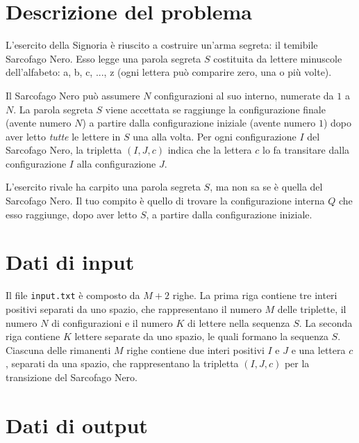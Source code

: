 \documentclass[a4paper,11pt]{article}
\begin{document}
\vspace{0.5cm}



\vspace{0.5cm}

\section*{Descrizione del problema}

L'esercito della Signoria è riuscito a costruire un'arma
segreta: il temibile Sarcofago Nero. Esso legge una parola
segreta $S$ costituita da lettere minuscole dell'alfabeto: a,
b, c, ..., z (ogni lettera può comparire zero, una o più
volte).

Il Sarcofago Nero può assumere $N$ configurazioni al
suo interno, numerate da $1$ a $N$. La parola
segreta $S$ viene accettata se raggiunge la configurazione
finale (avente numero $N$) a partire dalla configurazione
iniziale (avente numero $1$) dopo aver letto \emph{tutte} le lettere
in $S$ una alla volta. Per ogni configurazione $I$
del Sarcofago Nero, la tripletta $(I,J,c)$ indica che la
lettera $c$ lo fa transitare dalla
configurazione $I$ alla configurazione $J$.

L'esercito rivale ha carpito una parola segreta $S$, ma non
sa se è quella del Sarcofago Nero. Il tuo compito è
quello di trovare la configurazione interna $Q$ che esso
raggiunge, dopo aver letto $S$, a partire dalla
configurazione iniziale.


\section*{Dati di input}

Il file \texttt{input.txt} è composto da $M+2$
righe.  La prima riga contiene tre interi positivi separati da uno
spazio, che rappresentano il numero $M$ delle triplette, il
numero $N$ di configurazioni e il numero $K$ di
lettere nella sequenza $S$.  La seconda riga
contiene $K$ lettere separate da uno spazio, le quali
formano la sequenza $S$.  Ciascuna delle
rimanenti $M$ righe contiene due interi
positivi $I$ e $J$ e una lettera $c$,
separati da una spazio, che rappresentano la
tripletta $(I,J,c)$ per la transizione del Sarcofago Nero.


\section*{Dati di output}
\end{document}
